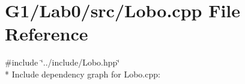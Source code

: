 \section{G1/\+Lab0/src/\+Lobo.cpp File Reference}
\label{_lobo_8cpp}
{\ttfamily \#include \char`\"{}../include/\+Lobo.\+hpp\char`\"{}}\\*
Include dependency graph for Lobo.\+cpp\+:
